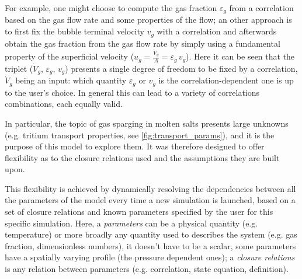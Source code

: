 \documentclass[a4paper,11pt,oneside]{report}
\newcounter{assumption}[chapter]
\begin{document}
For example, one might choose to compute the gas fraction $\varepsilon_g$ from a correlation based on the gas flow rate and some properties of the flow; an other approach is to first fix the bubble terminal velocity $v_g$ with a correlation and afterwards obtain the gas fraction from the gas flow rate by simply using a fundamental property of the superficial velocity ($u_g=\frac{\dot V_g}{A}=\varepsilon_g \,v_g$). Here it can be seen that the triplet ($\dot V_g$, $\varepsilon_g$, $v_g$) presents a single degree of freedom to be fixed by a correlation, $\dot V_g$ being an input: which quantity $\varepsilon_g$ or $v_g$ is the correlation-dependent one is up to the user's choice. In general this can lead to a variety of correlations combinations, each equally valid. 


In particular, the topic of gas sparging in molten salts presents large unknowns (e.g. tritium transport properties, see \cref{fig:transport_params}), and it is the purpose of this model to explore them. It was therefore designed to offer flexibility as to the closure relations used and the assumptions they are built upon. 

This flexibility is achieved by dynamically resolving the dependencies between all the parameters of the model every time a new simulation is launched, based on a set of closure relations and known parameters specified by the user for this specific simulation. Here, a \textit{parameters} can be a physical quantity (e.g. temperature) or more broadly any quantity used to describes the system (e.g. gas fraction, dimensionless numbers), it doesn't have to be a scalar, some parameters have a spatially varying profile (the pressure dependent ones); a \textit{closure relations} is any relation between parameters (e.g. correlation, state equation, definition).
\end{document}
